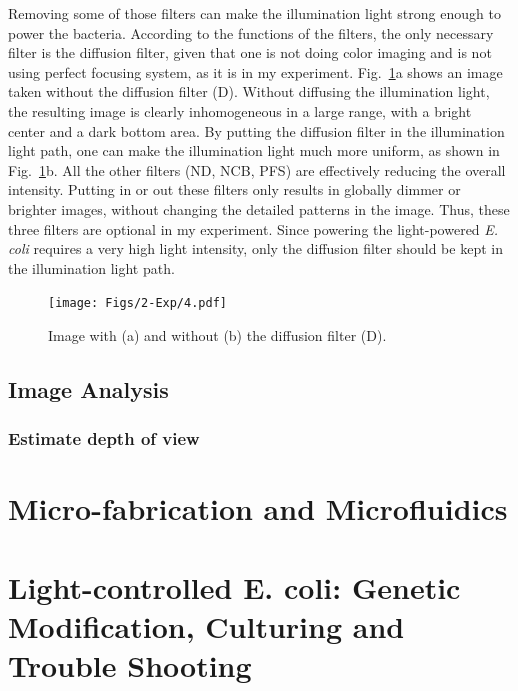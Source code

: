 Removing some of those filters can make the illumination light strong enough to power the bacteria. According to the functions of the filters, the only necessary filter is the diffusion filter, given that one is not doing color imaging and is not using perfect focusing system, as it is in my experiment. Fig.~\ref{fig:2-4}a shows an image taken without the diffusion filter (D). Without diffusing the illumination light, the resulting image is clearly inhomogeneous in a large range, with a bright center and a dark bottom area. By putting the diffusion filter in the illumination light path, one can make the illumination light much more uniform, as shown in Fig.~\ref{fig:2-4}b. All the other filters (ND, NCB, PFS) are effectively reducing the overall intensity. Putting in or out these filters only results in globally dimmer or brighter images, without changing the detailed patterns in the image. Thus, these three filters are optional in my experiment. Since powering the light-powered \textit{E. coli} requires a very high light intensity, only the diffusion filter should be kept in the illumination light path.

\begin{figure}[!]
	\begin{center}
	\texttt{[image: Figs/2-Exp/4.pdf]}
	\end{center}
	\caption[Figure 2.4:]
	{
	Image with (a) and without (b) the diffusion filter (D).
	}
	\label{fig:2-4}
\end{figure}





\subsection{Image Analysis}
\subsubsection{Estimate depth of view}








\section{Micro-fabrication and Microfluidics}
\label{micro-fabrication-and-microfluidics}

\section{Light-controlled E. coli: Genetic Modification, Culturing and Trouble Shooting}
\label{light-controlled-E-coli-genetic-modification-culturing-and-trouble-shooting}

